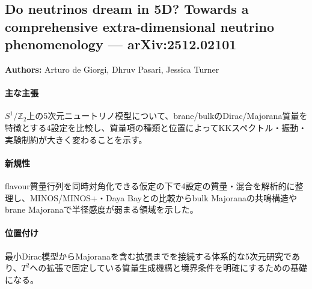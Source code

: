\subsection{Do neutrinos dream in 5D? Towards a comprehensive extra-dimensional neutrino phenomenology --- arXiv:2512.02101}

\textbf{Authors:} Arturo de Giorgi, Dhruv Pasari, Jessica Turner

\paragraph{主な主張}
$S^1/\mathbb{Z}_2$上の5次元ニュートリノ模型について、brane/bulkのDirac/Majorana質量を特徴とする4設定を比較し、質量項の種類と位置によってKKスペクトル・振動・実験制約が大きく変わることを示す\cite{deGiorgi:2026Neutrinos5D}。

\paragraph{新規性}
flavour質量行列を同時対角化できる仮定の下で4設定の質量・混合を解析的に整理し、MINOS/MINOS+・Daya Bayとの比較からbulk Majoranaの共鳴構造やbrane Majoranaで半径感度が弱まる領域を示した。

\paragraph{位置付け}
最小Dirac模型からMajoranaを含む拡張までを接続する体系的な5次元研究であり、$T^2$への拡張で固定している質量生成機構と境界条件を明確にするための基礎になる。

